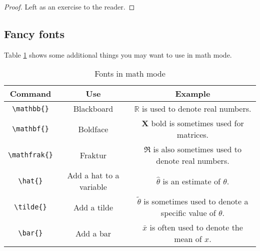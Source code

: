 \begin{proof}
Left as an exercise to the reader.
\end{proof}

\subsection{Fancy fonts}

Table \ref{tab:fonts} shows some additional things you may want to use in math mode.

\begin{table}[h!]
	\centering
	\label{tab:fonts}
	\caption{Fonts in math mode}
\begin{footnotesize}
  \begin{center}
    \begin{tabular}{c c c}
      \hline
Command & Use & Example \\ \hline
\verb|\mathbb{}| & Blackboard & $\mathbb{R}$ is used to denote real numbers.\\
\verb|\mathbf{}| & Boldface & $\mathbf{X}$ bold is sometimes used for matrices.\\
\verb|\mathfrak{}| & Fraktur & $\mathfrak{R}$ is also sometimes used to denote real numbers.\\
\verb|\hat{}| & Add a hat to a variable & $\hat{\theta}$ is an estimate of $\theta$.\\
\verb|\tilde{}| & Add a tilde & $\tilde{\theta}$ is sometimes used to denote a specific value of $\theta$.\\
\verb|\bar{}| & Add a bar & $\bar{x}$ is often used to denote the mean of $x$.\\



      \hline
    \end{tabular}
  \end{center}
\end{footnotesize}
\end{table}



